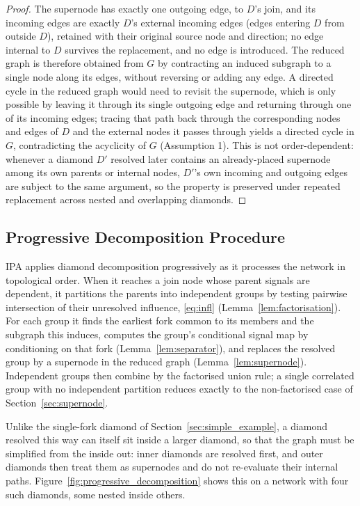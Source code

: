 \documentclass[preprint,12pt]{elsarticle}
\begin{document}
\begin{proof}
The supernode has exactly one outgoing edge, to $D$'s join, and its incoming edges are exactly $D$'s external incoming edges (edges entering $D$ from outside $D$), retained with their original source node and direction; no edge internal to $D$ survives the replacement, and no edge is introduced. The reduced graph is therefore obtained from $G$ by contracting an induced subgraph to a single node along its edges, without reversing or adding any edge. A directed cycle in the reduced graph would need to revisit the supernode, which is only possible by leaving it through its single outgoing edge and returning through one of its incoming edges; tracing that path back through the corresponding nodes and edges of $D$ and the external nodes it passes through yields a directed cycle in $G$, contradicting the acyclicity of $G$ (Assumption 1). This is not order-dependent: whenever a diamond $D'$ resolved later contains an already-placed supernode among its own parents or internal nodes, $D'$'s own incoming and outgoing edges are subject to the same argument, so the property is preserved under repeated replacement across nested and overlapping diamonds.
\end{proof}

\subsection{Progressive Decomposition Procedure}\label{sec:procedure}

IPA applies diamond decomposition progressively as it processes the network in topological order. When it reaches a join node whose parent signals are dependent, it partitions the parents into independent groups by testing pairwise intersection of their unresolved influence, \eqref{eq:infl} (Lemma~\ref{lem:factorisation}). For each group it finds the earliest fork common to its members and the subgraph this induces, computes the group's conditional signal map by conditioning on that fork (Lemma~\ref{lem:separator}), and replaces the resolved group by a supernode in the reduced graph (Lemma~\ref{lem:supernode}). Independent groups then combine by the factorised union rule; a single correlated group with no independent partition reduces exactly to the non-factorised case of Section~\ref{sec:supernode}.

Unlike the single-fork diamond of Section~\ref{sec:simple_example}, a diamond resolved this way can itself sit inside a larger diamond, so that the graph must be simplified from the inside out: inner diamonds are resolved first, and outer diamonds then treat them as supernodes and do not re-evaluate their internal paths. Figure~\ref{fig:progressive_decomposition} shows this on a network with four such diamonds, some nested inside others.
\end{document}

